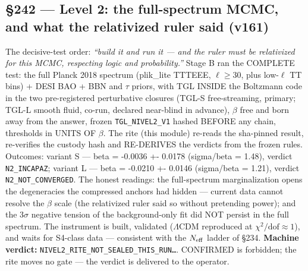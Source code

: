 \documentclass[11pt]{article}
\theoremstyle{definition}\newtheorem{deriv}{Derivation}
\begin{document}
\subsection*{\S242 --- Level 2: the full-spectrum MCMC, and what the relativized ruler said (v161)}The decisive-test order: \emph{``build it and run it --- and the ruler must be relativized for this MCMC, respecting logic and probability.''} Stage B ran the COMPLETE test: the full Planck 2018 spectrum (plik\_lite TTTEEE, $\ell{\geq}30$, plus low-$\ell$ TT bins) + DESI BAO + BBN and $\tau$ priors, with TGL INSIDE the Boltzmann code in the two pre-registered perturbative closures (TGL-S free-streaming, primary; TGL-L smooth fluid, co-run, declared near-blind in advance), $\beta$ free and born away from the answer, frozen \texttt{TGL\_NIVEL2\_V1} hashed BEFORE any chain, thresholds in UNITS OF $\beta$. The rite (this module) re-reads the sha-pinned result, re-verifies the custody hash and RE-DERIVES the verdicts from the frozen rules. Outcomes: variant S --- beta = -0.0036 +- 0.0178 (sigma/beta = 1.48), verdict \texttt{N2\_INCAPAZ}; variant L --- beta = -0.0210 +- 0.0146 (sigma/beta = 1.21), verdict \texttt{N2\_NOT\_CONVERGED}. The honest readings: the full-spectrum marginalization opens the degeneracies the compressed anchors had hidden --- current data cannot resolve the $\beta$ scale (the relativized ruler said so without pretending power); and the $3\sigma$ negative tension of the background-only fit did NOT persist in the full spectrum. The instrument is built, validated ($\Lambda$CDM reproduced at $\chi^2/\mathrm{dof}{\approx}1$), and waits for S4-class data --- consistent with the $N_{\rm eff}$ ladder of \S234. \textbf{Machine verdict:} \texttt{NIVEL2\_RITE\_NOT\_SEALED\_THIS\_RUN\ldots}. CONFIRMED is forbidden; the rite moves no gate --- the verdict is delivered to the operator.
\end{document}
